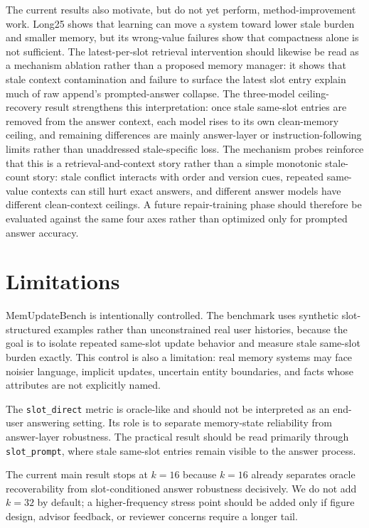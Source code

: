 \documentclass[11pt]{article}
\begin{document}
The current results also motivate, but do not yet perform, method-improvement work. Long25 shows that learning can move a system toward lower stale burden and smaller memory, but its wrong-value failures show that compactness alone is not sufficient. The latest-per-slot retrieval intervention should likewise be read as a mechanism ablation rather than a proposed memory manager: it shows that stale context contamination and failure to surface the latest slot entry explain much of raw append's prompted-answer collapse. The three-model ceiling-recovery result strengthens this interpretation: once stale same-slot entries are removed from the answer context, each model rises to its own clean-memory ceiling, and remaining differences are mainly answer-layer or instruction-following limits rather than unaddressed stale-specific loss. The mechanism probes reinforce that this is a retrieval-and-context story rather than a simple monotonic stale-count story: stale conflict interacts with order and version cues, repeated same-value contexts can still hurt exact answers, and different answer models have different clean-context ceilings. A future repair-training phase should therefore be evaluated against the same four axes rather than optimized only for prompted answer accuracy.

\section{Limitations}

MemUpdateBench is intentionally controlled. The benchmark uses synthetic slot-structured examples rather than unconstrained real user histories, because the goal is to isolate repeated same-slot update behavior and measure stale same-slot burden exactly. This control is also a limitation: real memory systems may face noisier language, implicit updates, uncertain entity boundaries, and facts whose attributes are not explicitly named.

The \texttt{slot\_direct} metric is oracle-like and should not be interpreted as an end-user answering setting. Its role is to separate memory-state reliability from answer-layer robustness. The practical result should be read primarily through \texttt{slot\_prompt}, where stale same-slot entries remain visible to the answer process.

The current main result stops at \(k=16\) because \(k=16\) already separates oracle recoverability from slot-conditioned answer robustness decisively. We do not add \(k=32\) by default; a higher-frequency stress point should be added only if figure design, advisor feedback, or reviewer concerns require a longer tail.
\end{document}
